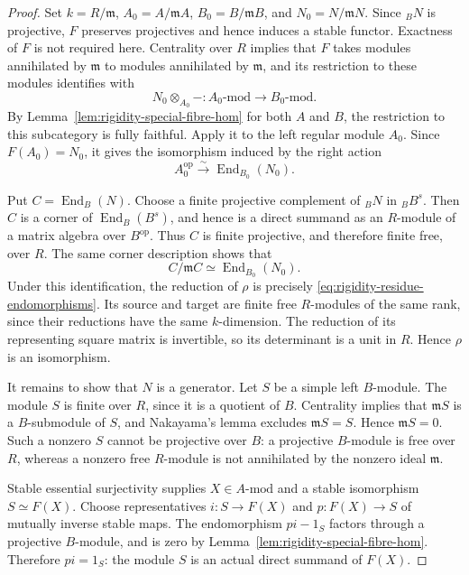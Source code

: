 \documentclass[12pt,a4paper,english,reqno]{amsart}
\numberwithin{equation}{section}
\theoremstyle{plain}
\theoremstyle{definition}
\begin{document}
\begin{proof}
Set $k=R/\mathfrak m$, $A_0=A/\mathfrak mA$,
$B_0=B/\mathfrak mB$, and $N_0=N/\mathfrak mN$.
Since ${}_BN$ is projective, $F$ preserves projectives and hence
induces a stable functor.  Exactness of $F$ is not required here.  Centrality over $R$ implies that $F$ takes modules
annihilated by $\mathfrak m$ to modules annihilated by $\mathfrak m$,
and its restriction to these modules identifies with
\[
 N_0\otimes_{A_0}-:A_0\text{-}\mathrm{mod}
                       \longrightarrow B_0\text{-}\mathrm{mod}.
\]
By Lemma~\ref{lem:rigidity-special-fibre-hom} for both $A$ and $B$,
the restriction to this subcategory is fully faithful.  Apply it to the left regular module $A_0$.  Since
$F(A_0)=N_0$, it gives the isomorphism induced by the right action
\begin{equation}
 A_0^{\mathrm{op}}\xrightarrow{\sim}
       \operatorname{End}_{B_0}(N_0).
 \label{eq:rigidity-residue-endomorphisms}
\end{equation}

Put $C=\operatorname{End}_B(N)$.  Choose a finite projective
complement of ${}_BN$ in ${}_BB^s$.  Then $C$ is a corner of
$\operatorname{End}_B(B^s)$, and hence is a direct summand as an
$R$-module of a matrix algebra over $B^{\mathrm{op}}$.  Thus $C$ is
finite projective, and therefore finite free, over $R$.  The same
corner description shows that
\[
 C/\mathfrak mC\simeq\operatorname{End}_{B_0}(N_0).
\]
Under this identification, the reduction of $\rho$ is precisely
\eqref{eq:rigidity-residue-endomorphisms}.  Its source and target are finite free $R$-modules of the same rank,
since their reductions have the same $k$-dimension.  The reduction
of its representing square matrix is invertible, so its determinant
is a unit in $R$.  Hence $\rho$ is an isomorphism.

It remains to show that $N$ is a generator.  Let $S$ be a simple
left $B$-module.  The module $S$ is finite over $R$, since it is a
quotient of $B$.  Centrality implies that $\mathfrak mS$ is a
$B$-submodule of $S$, and Nakayama's lemma excludes
$\mathfrak mS=S$.  Hence $\mathfrak mS=0$.
Such a nonzero $S$ cannot be projective over
$B$: a projective $B$-module is free over $R$, whereas a nonzero
free $R$-module is not annihilated by the nonzero ideal
$\mathfrak m$.

Stable essential surjectivity supplies $X\in A\text{-}\mathrm{mod}$
and a stable isomorphism $S\simeq F(X)$.  Choose representatives
$i:S\to F(X)$ and $p:F(X)\to S$ of mutually inverse stable maps.
The endomorphism $pi-1_S$ factors through a projective $B$-module,
and is zero by Lemma~\ref{lem:rigidity-special-fibre-hom}.
Therefore $pi=1_S$: the module $S$ is an actual direct summand of
$F(X)$.


\end{proof}
\end{document}
